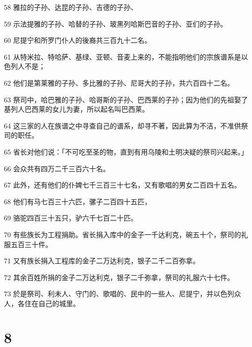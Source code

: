 \par 58 雅拉的子孙、达昆的子孙、吉德的子孙、
\par 59 示法提雅的子孙、哈替的子孙、玻黑列哈斯巴音的子孙、亚们的子孙。
\par 60 尼提宁和所罗门仆人的後裔共三百九十二名。
\par 61 从特米拉、特哈萨、基绿、亚顿、音麦上来的，不能指明他们的宗族谱系是以色列人不是；
\par 62 他们是第莱雅的子孙、多比雅的子孙、尼哥大的子孙，共六百四十二名。
\par 63 祭司中，哈巴雅的子孙、哈哥斯的子孙、巴西莱的子孙；因为他们的先祖娶了基列人巴西莱的女儿为妻，所以起名叫巴西莱。
\par 64 这三家的人在族谱之中寻查自己的谱系，却寻不著，因此算为不洁，不准供祭司的职任。
\par 65 省长对他们说：「不可吃至圣的物，直到有用乌陵和土明决疑的祭司兴起来。」
\par 66 会众共有四万二千三百六十名。
\par 67 此外，还有他们的仆婢七千三百三十七名，又有歌唱的男女二百四十五名。
\par 68 他们有马七百三十六匹，骡子二百四十五匹，
\par 69 骆驼四百三十五只，驴六千七百二十匹。
\par 70 有些族长为工程捐助。省长捐入库中的金子一千达利克，碗五十个，祭司的礼服五百三十件。
\par 71 又有族长捐入工程库的金子二万达利克，银子二千二百弥拿。
\par 72 其余百姓所捐的金子二万达利克，银子二千弥拿，祭司的礼服六十七件。
\par 73 於是祭司、利未人、守门的、歌唱的、民中的一些人、尼提宁，并以色列众人，各住在自己的城里。

\chapter{8}

